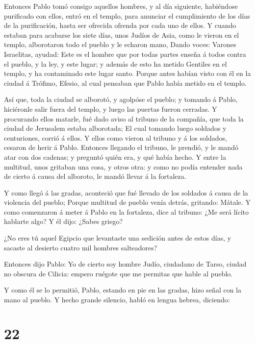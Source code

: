  Entonces Pablo tomó consigo aquellos hombres, y al día
siguiente, habiéndose purificado con ellos, entró en el templo, para
anunciar el cumplimiento de los días de la purificación, hasta ser
ofrecida ofrenda por cada uno de ellos.  Y cuando estaban
para acabarse los siete días, unos Judíos de Asia, como le vieron en el
templo, alborotaron todo el pueblo y le echaron mano, 
Dando voces: Varones Israelitas, ayudad: Este es el hombre que por todas
partes enseña á todos contra el pueblo, y la ley, y este lugar; y además
de esto ha metido Gentiles en el templo, y ha contaminado este lugar
santo.  Porque antes habían visto con él en la ciudad á
Trófimo, Efesio, al cual pensaban que Pablo había metido en el templo.

 Así que, toda la ciudad se alborotó, y agolpóse el pueblo;
y tomando á Pablo, hiciéronle salir fuera del templo, y luego las
puertas fueron cerradas.  Y procurando ellos matarle, fué
dado aviso al tribuno de la compañía, que toda la ciudad de Jerusalem
estaba alborotada;  El cual tomando luego soldados y
centuriones, corrió á ellos. Y ellos como vieron al tribuno y á los
soldados, cesaron de herir á Pablo.  Entonces llegando el
tribuno, le prendió, y le mandó atar con dos cadenas; y preguntó quién
era, y qué había hecho.  Y entre la multitud, unos gritaban
una cosa, y otros otra: y como no podía entender nada de cierto á causa
del alboroto, le mandó llevar á la fortaleza.

 Y como llegó á las gradas, aconteció que fué llevado de
los soldados á causa de la violencia del pueblo;  Porque
multitud de pueblo venía detrás, gritando: Mátale.  Y como
comenzaron á meter á Pablo en la fortaleza, dice al tribuno: ¿Me será
lícito hablarte algo? Y él dijo: ¿Sabes griego?

 ¿No eres tú aquel Egipcio que levantaste una sedición
antes de estos días, y sacaste al desierto cuatro mil hombres
salteadores?

 Entonces dijo Pablo: Yo de cierto soy hombre Judío,
ciudadano de Tarso, ciudad no obscura de Cilicia: empero ruégote que me
permitas que hable al pueblo.

 Y como él se lo permitió, Pablo, estando en pie en las
gradas, hizo señal con la mano al pueblo. Y hecho grande silencio, habló
en lengua hebrea, diciendo:

\hypertarget{section-21}{%
\section{22}\label{section-21}}

